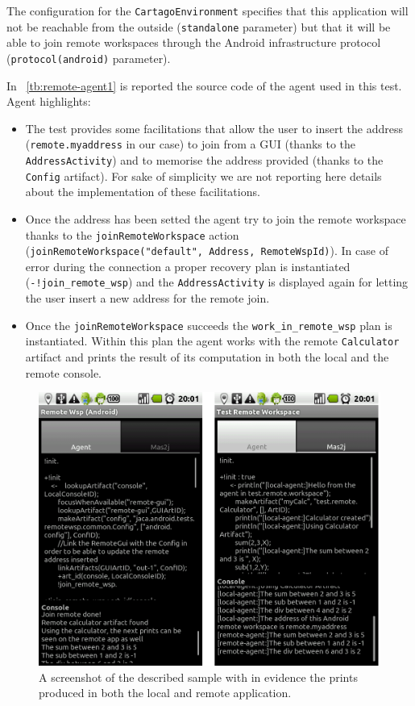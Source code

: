 \documentclass[11pt]{report}
\newcommand\labelfig[1]{\label{fig:#1}}
\newcommand\xt[1]{\tablename~\ref{tb:#1}}
\newcommand\code[1]{{\mbox{\texttt{{#1}}}}}
\newcommand{\jason}{\mbox{\sf{\emph{{Jason}}}}}
\begin{document}
\noindent The configuration for the \code{CartagoEnvironment} specifies that this application will not be reachable from the outside (\code{standalone} parameter) but that it will be able to join remote workspaces through the Android infrastructure protocol (\code{protocol(android)} parameter).


In \xt{remote-agent1} is reported the source code of the agent used in this test.
%
Agent highlights:

\begin{itemize}
%
\item The test provides some facilitations that allow the user to insert the address (\code{remote.myaddress} in our case) to join from a GUI (thanks to the \code{AddressActivity}) and to memorise the address provided (thanks to the \code{Config} artifact). For sake of simplicity we are not reporting here details about the implementation of these facilitations.
%
\item Once the address has been setted the agent try to join the remote workspace thanks to the \code{joinRemoteWorkspace} action (\code{joinRemoteWorkspace("default", Address, RemoteWspId)}). In case of error during the connection a proper \jason{} recovery plan is instantiated (\code{-!join\_remote\_wsp}) and the \code{AddressActivity} is displayed again for letting the user insert a new address for the remote join.
%
\item Once the \code{joinRemoteWorkspace} succeeds the \code{work\_in\_remote\_wsp} plan is instantiated. Within this plan the agent works with the remote \code{Calculator} artifact and prints the result of its computation in both the local and the remote console.
%
\end{itemize}

\begin{figure}[!hb]
\begin{center}
\includegraphics[width=.9\linewidth]{images/test_remote1_gui.png}
\end{center}
\caption{A screenshot of the described sample with in evidence the prints produced in both the local and remote application.}
\labelfig{remote1}
\end{figure}
\clearpage
\end{document}
